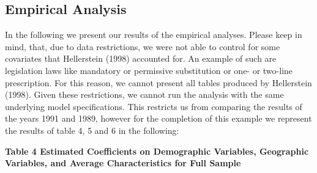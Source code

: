 \documentclass[
]{book}
\begin{document}
\hypertarget{empirical-analysis}{%
\subsection{Empirical Analysis}\label{empirical-analysis}}

In the following we present our results of the empirical analyses.
Please keep in mind, that, due to data restrictions, we were not able to
control for some covariates that Hellerstein (1998) accounted for. An
example of such are legislation laws like mandatory or permissive
substitution or one- or two-line prescription. For this reason, we
cannot present all tables produced by Hellerstein (1998). Given these
restrictions, we cannot run the analysis with the same underlying model
specifications. This restricts us from comparing the results of the
years 1991 and 1989, however for the completion of this example we
represent the results of table 4, 5 and 6 in the following:

\textbf{Table 4 Estimated Coefficients on Demographic Variables,
Geographic Variables, and Average Characteristics for Full Sample}
\end{document}
